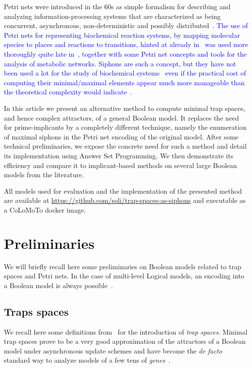 \documentclass[runningheads]{llncs}
\newcommand{\revise}[1]{\textcolor{blue}{#1}}
\begin{document}
Petri nets were introduced in the 60s as simple formalism for describing and analyzing information-processing systems that are characterized as being concurrent, asynchronous, non-deterministic and possibly distributed~\cite{peterson1981petri,Murata1989}.
\revise{The use of Petri nets for representing biochemical reaction systems, by mapping molecular species to places and reactions to transitions, hinted at already in~\cite{peterson1981petri,Murata1989} was used more thoroughly quite late in~\cite{reddy1993petri}, together with some Petri net concepts and tools for the analysis of metabolic networks.
Siphons are such a concept, but they have not been used a lot for the study of biochemical systems~\cite{zevedei2003topological,blatke2015biomodel} even if the practical cost of computing their minimal/maximal elements appear much more manageable than the theoretical complexity would indicate~\cite{oanea2010new,nabli2016enumerating}.}

In this article we present an alternative method to compute minimal trap spaces, and hence complex attractors, of a general Boolean model. It replaces the need for prime-implicants by a completely different technique, namely the enumeration of maximal siphons in the Petri net encoding of the original model.
After some technical preliminaries, we expose the concrete need for such a method and detail its implementation using Answer Set Programming.
We then demonstrate its efficiency and compare it to implicant-based methods on several large Boolean models from the literature.


All models used for evaluation and the implementation of the presented method are available at \url{https://github.com/soli/trap-spaces-as-siphons} and executable as a CoLoMoTo docker image.

\section{Preliminaries}

We will briefly recall here some preliminaries on Boolean models related to trap spaces and Petri nets.
In the case of multi-level Logical models, an encoding into a Boolean model is always possible~\cite{Didier2011}.

\subsection{Traps spaces}

We recall here some definitions from~\cite{klarner2015computing} for the introduction of \emph{trap spaces}.
Minimal trap spaces prove to be a very good approximation of the attractors of a Boolean model under asynchronous update schemes and have become the \emph{de facto} standard way to analyze models of a few tens of \emph{genes}~\cite{klarner2017pyboolnet,cifuentes2020control}.
\end{document}
